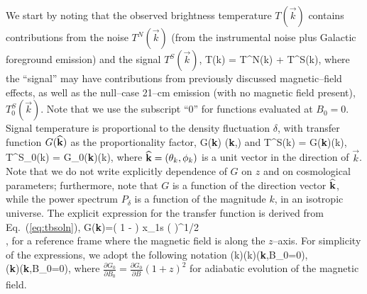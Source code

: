 We start by noting that the observed brightness temperature $T(\vec k)$ contains contributions from the noise $T^N(\vec k)$ (from the instrumental noise plus Galactic foreground emission) and the signal $T^S(\vec k)$, 
\beq
\bga
T(\vec k) = T^N(\vec k) + T^S(\vec k),
\ega
\label{eq:Ttot}
\eeq
where the ``signal'' may have contributions from previously discussed magnetic--field effects, as well as the null--case 21--cm emission (with no magnetic field present), $T^S_0(\vec k)$. Note that we use the subscript ``0'' for functions evaluated at $B_0=0$. Signal temperature is proportional to the density fluctuation $\delta$, with transfer function $G({\bf{\widehat k}})$ as the proportionality factor, 
\beq
\bga
G({\bf{\widehat k}}) \equiv {}({\bf{\widehat k}},)
\ega
\eeq
and
\beq
\bga
T^S(\vec k) = G({\bf{\widehat k}})\delta(k),\\
T^S_0(\vec k) = G_0({\bf{\widehat k}})\delta(k),
\ega
\label{eq:def_G}
\eeq
where ${\bf{\widehat k}}=(\theta_k,\phi_k)$ is a unit vector in the direction of $\vec k$. Note that we do not write explicitly dependence of $G$ on $z$ and on cosmological parameters; furthermore, note that $G$ is a function of the direction vector ${\bf{\widehat k}}$, while the power spectrum $P_\delta$ is a function of the magnitude $k$, in an isotropic universe. 
The explicit expression for the transfer function is derived from Eq.~(\ref{eq:tbsoln}),
\beq
\bga
G({\bf{\widehat k}})=\left( 1 -  \right) x_{1{\rm s}} \left(  \right)^{1/2} \\
\times {} ,
\label{eq:G_def}
\ega
\eeq
for a reference frame where the magnetic field is along the $z$--axis.
For simplicity of the expressions, we adopt the following notation
\beq
\bga
{}(\vec k)\equiv  \delta(k)({\bf{\widehat k}},B_0=0),\\
({\bf{\widehat k}})\equiv{}({\bf{\widehat k}},B_0=0),
\ega
\label{eq:dTdB_dGdB}
\eeq
where $\frac{\partial G_0}{\partial B_0}=\frac{\partial G_0}{\partial B} (1+z)^2$ for adiabatic evolution of the magnetic field. 

